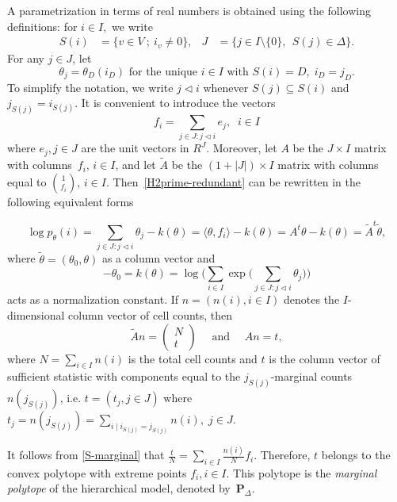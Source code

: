 \documentclass[aos,noinfoline]{imsart}
\def\t{\theta}
\def\tl{\triangleleft}
\newcommand{\Pbf}{\mathbf{P}}
\theoremstyle{remark}
\theoremstyle{definition}
\begin{document}
A parametrization in terms of real numbers is obtained using the following definitions: for $i\in I,$ we write
\begin{align*}
  S(i)&=\{v\in V\ ; \ i_{v}\neq 0\}, &
  J&=\{ j\in I\setminus\{0\},\ \ S(j)\in \Delta\}.
\end{align*}
For any $j\in J$, let
\begin{equation*}
  \theta_j = \theta_D(i_D)\text{ for the unique }i\in I\text{ with }S(i)=D,\;i_D=j_D.
\end{equation*}
To simplify the notation, we write $j\tl i$ whenever $S(j)\subseteq S(i)$ and $j_{S(j)}=i_{S(j)}$.
It is convenient to introduce the vectors
\begin{equation*}
  f_i= \sum_{j\in J:j\tl i}e_j,\;\;i\in I
\end{equation*}
where $e_j, j\in J$ are the unit vectors in $R^J$.  Moreover, let $A$ be the $J\times I$ matrix with columns~$f_{i}$,
$i\in I$, and let $\tilde A$ be the $(1+|J|)\times I$ matrix with columns equal to $\binom{1}{f_{i}}$, $i\in I$.
%
Then~\eqref{H2prime-redundant} can be rewritten in the following equivalent forms %

\begin{equation}
  \label{S-HXtilde}
  \log p_{\theta}(i) = \sum_{j\in J: j\tl i}\theta_j - k(\theta)
  = \langle \theta, f_i\rangle - k(\theta)
  = A^{t}\theta - k(\theta) = \tilde A^{t}\tilde\theta,
\end{equation}
where $\tilde{\theta}=(\theta_{0}, \theta)$ as a column vector and 
\begin{equation}
\label{S-all}
 -\theta_0= k(\theta) = \log\Big(\sum_{i\in I}\exp\Big(\sum_{j\in J: j\tl i} \theta_j\Big)\Big)
\end{equation}
acts as a normalization constant.
If $n=(n(i),i\in I)$ denotes the $I$-di\-men\-sional column vector of cell counts, then
\begin{equation}
  \label{S-marginal}
  \tilde{A}n=\left(\begin{array}{c}N\\t\end{array}\right)
  \quad\text{ and }\quad
  A n= t,
\end{equation}
where $N=\sum_{i\in I}n(i)$ is the total cell counts and $t$ is the column vector of sufficient statistic with components equal to the $j_{S(j)}$-marginal counts
$n(j_{S(j)})$, i.e. $t=(t_j, j\in J)$ where $t_j=n(j_{S(j)})=\sum_{i\mid i_{S(j)}=j_{S(j)}}n(i),\; j\in J$.

It follows from \eqref{S-marginal} that $\frac{t}{N}=\sum_{i\in I}\frac{n(i)}{N}f_i$.  Therefore, $t$ belongs to the
convex polytope with extreme points $f_i,i\in I$. This polytope is the \emph{marginal polytope} of the hierarchical
model, denoted by~$\Pbf_\Delta$.
\end{document}

